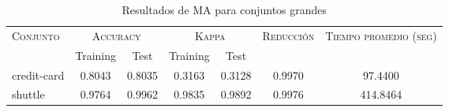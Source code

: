 \begin{table}[]
\centering
\begin{tabular}{l c c c c c c}
\hline
\multirow{2}{*}{\textsc{Conjunto}}
	& \multicolumn{2}{c}{\textsc{Accuracy}}
	& \multicolumn{2}{c}{\textsc{Kappa}}
	& \textsc{Reducción}
	& \textsc{Tiempo promedio (seg)} \\
	& Training & Test
	& Training & Test \\ 
\hline
\hline

credit-card & 0.8043 & 0.8035 & 0.3163 & 0.3128 & 0.9970 & 97.4400 \\
shuttle & 0.9764 & 0.9962 & 0.9835 & 0.9892 & 0.9976 & 414.8464 \\

\hline
\end{tabular}
\caption{Resultados de MA para conjuntos grandes }
\label{res-grande-ma}
\end{table}

